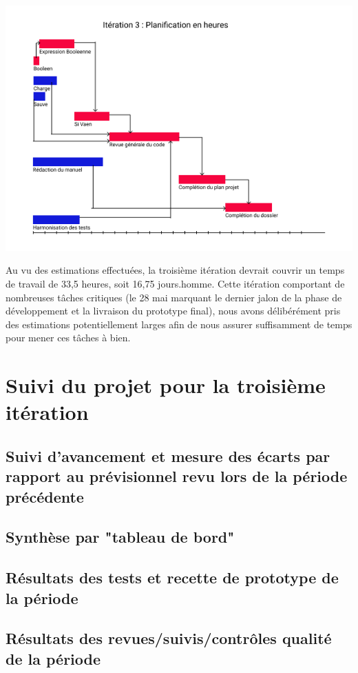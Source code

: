  \includegraphics[scale=0.75]{fichiers/planification/iteration3/iteration3Planif.png}

Au vu des estimations effectuées, la troisième itération devrait couvrir un temps
de travail de 33,5 heures, soit 16,75 jours.homme. Cette itération comportant de
nombreuses tâches critiques (le 28 mai marquant le dernier jalon de la phase de
développement et la livraison du prototype final), nous avons délibérément pris des estimations potentiellement larges
afin de nous assurer suffisamment de temps pour mener ces tâches à bien.

\section{Suivi du projet pour la troisième itération}

\subsection{Suivi d’avancement et mesure des écarts par rapport au prévisionnel revu lors de la période précédente}

\subsection{Synthèse par "tableau de bord"}

    \subsection{Résultats des tests et recette de prototype de la période}

\subsection{Résultats des revues/suivis/contrôles qualité de la période}

